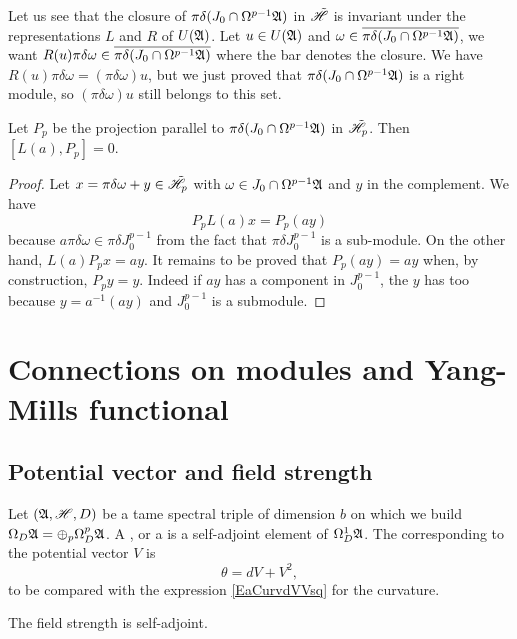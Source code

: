 Let us see that the closure of $\pi\delta(J_0\cap\Omega^{p-1}\mathfrak{A})$ in $\tilde{\mathscr{H}}$ is invariant under the representations $L$ and $R$ of $U(\mathfrak{A})$. Let $u\in U(\mathfrak{A})$ and $\omega\in \overline{ \pi\delta(J_0\cap \Omega^{p-1}\mathfrak{A}) }$, we want $R(u)\pi\delta\omega\in\overline{ \pi\delta(J_0\cap\Omega^{p-1}\mathfrak{A}) }$ where the bar denotes the closure. We have $R(u)\pi\delta\omega=(\pi\delta\omega)u$, but we just proved that $\pi\delta(J_0\cap\Omega^{p-1}\mathfrak{A})$ is a right module, so $(\pi\delta\omega)u$ still belongs to this set.

\begin{proposition}
Let $P_{p}$ be the projection parallel to $\pi\delta(J_0\cap \Omega^{p-1}\mathfrak{A})$ in $\tilde{\mathscr{H}}_{p}$. Then $[L(a),P_{p}]=0$.
\end{proposition}

\begin{proof}
Let $x=\pi\delta\omega+y\in\tilde{\mathscr{H}}_{p}$ with $\omega\in J_0\cap\Omega^{p-1}\mathfrak{A}$ and $y$ in the complement. We have 
\[ 
  P_{p}L(a)x=P_{p}(ay)
\]
because $a\pi\delta\omega\in\pi\delta J_0^{p-1}$ from the fact that $\pi\delta J_0^{p-1}$ is a sub-module. On the other hand, $L(a)P_{p}x=ay$. It remains to be proved that $P_{p}(ay)=ay$ when, by construction, $P_{p}y=y$. Indeed if  $ay$ has a component in $J_0^{p-1}$, the $y$ has too because $y=a^{-1}(ay)$ and $J_0^{p-1}$ is a submodule.
\end{proof}
\section{Connections on modules and Yang-Mills functional}

\subsection{Potential vector and field strength}

Let $(\mathfrak{A},\mathscr{H},D)$ be a tame spectral triple of dimension $b$ on which we build $\Omega_D\mathfrak{A}=\oplus_{p}\Omega_D^{p}\mathfrak{A}$. A , or a  is a self-adjoint element of $\Omega_D^{1}\mathfrak{A}$. The  corresponding to the potential vector $V$ is 
\[ 
  \theta=dV+V^{2},
\]
to be compared with the expression \eqref{EaCurvdVVsq} for the curvature. 

\begin{proposition}
The field strength is self-adjoint.
\end{proposition}

